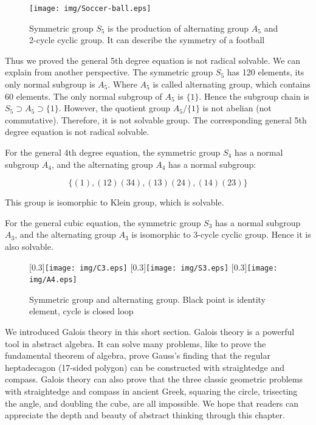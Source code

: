 \documentclass{article}
\begin{document}
\begin{figure}[htbp]
 \centering
 \texttt{[image: img/Soccer-ball.eps]}
 \captionsetup{labelformat=empty}
 \caption{Symmetric group $S_5$ is the production of alternating group $A_5$ and 2-cycle cyclic group. It can describe the symmetry of a football}
 \label{fig:S5}
\end{figure}

Thus we proved the general 5th degree equation is not radical solvable. We can explain from another perspective. The symmetric group $S_5$ has 120 elements, its only normal subgroup is $A_5$. Where $A_5$ is called alternating group, which contains 60 elements. The only normal subgroup of $A_5$ is $\{1\}$. Hence the subgroup chain is $S_5 \supset A_5 \supset \{1\}$. However, the quotient group $A_5/\{1\}$ is not abelian (not commutative). Therefore, it is not solvable group. The corresponding general 5th degree equation is not radical solvable.

For the general 4th degree equation, the symmetric group $S_4$ has a normal subgroup $A_4$, and the alternating group $A_4$ has a normal subgroup:

\[
\{(1), (1 2)(3 4), (1 3)(2 4), (1 4)(2 3)\}
\]

This group is isomorphic to Klein group, which is solvable.

For the general cubic equation, the symmetric group $S_3$ has a normal subgroup $A_3$, and the alternating group $A_3$ is isomorphic to 3-cycle cyclic group. Hence it is also solvable.

\begin{figure}[htbp]
  \centering
  [0.3\linewidth]{\texttt{[image: img/C3.eps]}} \quad
  [0.3\linewidth]{\texttt{[image: img/S3.eps]}}
  [0.3\linewidth]{\texttt{[image: img/A4.eps]}}
  \caption{Symmetric group and alternating group. Black point is identity element, cycle is closed loop}
  \label{fig:group-graph}
\end{figure}

We introduced Galois theory in this short section. Galois theory is a powerful tool in abstract algebra. It can solve many problems, like to prove the fundamental theorem of algebra, prove Gauss's finding that the regular heptadecagon (17-sided polygon) can be constructed with straightedge and compass. Galois theory can also prove that the three classic geometric problems with straightedge and compass in ancient Greek, squaring the circle, trisecting the angle, and doubling the cube, are all impossible. We hope that readers can appreciate the depth and beauty of abstract thinking through this chapter.
\end{document}
